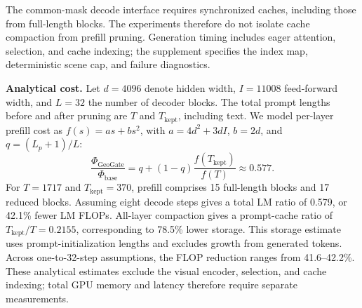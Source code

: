 \begin{center}
\small
{}
\end{center}

The common-mask decode interface requires synchronized caches, including those from full-length blocks. The experiments therefore do not isolate cache compaction from prefill pruning. Generation timing includes eager attention, selection, and cache indexing; the supplement specifies the index map, deterministic scene cap, and failure diagnostics.

\textbf{Analytical cost.} Let $d=4096$ denote hidden width, $I=11008$ feed-forward width, and $L=32$ the number of decoder blocks. The total prompt lengths before and after pruning are $T$ and $T_{\text{kept}}$, including text. We model per-layer prefill cost as $f(s)=as+bs^2$, with $a=4d^2+3dI$, $b=2d$, and $q=(L_p+1)/L$:
\begin{equation}
\frac{\Phi_{\text{GeoGate}}}{\Phi_{\text{base}}}
=q+(1-q)\frac{f(T_{\text{kept}})}{f(T)}
\approx 0.577.
\end{equation}
For $T=1717$ and $T_{\text{kept}}=370$, prefill comprises 15 full-length blocks and 17 reduced blocks. Assuming eight decode steps gives a total LM ratio of 0.579, or 42.1\% fewer LM FLOPs. All-layer compaction gives a prompt-cache ratio of $T_{\text{kept}}/T=0.2155$, corresponding to 78.5\% lower storage. This storage estimate uses prompt-initialization lengths and excludes growth from generated tokens. Across one-to-32-step assumptions, the FLOP reduction ranges from 41.6--42.2\%. These analytical estimates exclude the visual encoder, selection, and cache indexing; total GPU memory and latency therefore require separate measurements.
